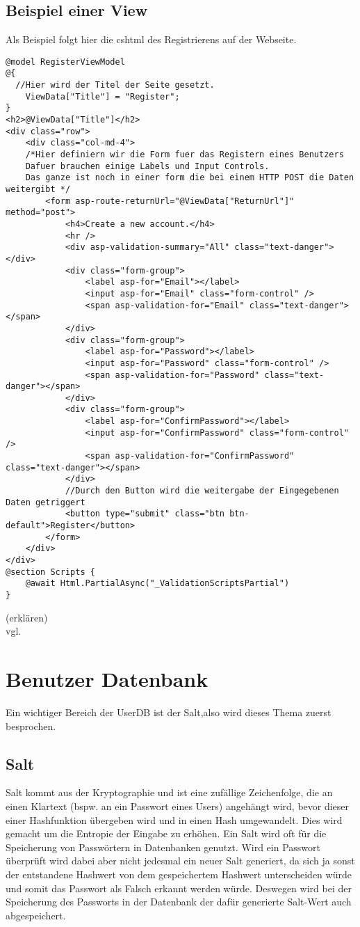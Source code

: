 {\subsection{Beispiel einer View}
\label{mvc_view_beispiel}
Als Beispiel folgt hier die cshtml des Registrierens auf der Webseite.
\begin{lstlisting}
@model RegisterViewModel
@{
  //Hier wird der Titel der Seite gesetzt.
    ViewData["Title"] = "Register";
}
<h2>@ViewData["Title"]</h2>
<div class="row">
    <div class="col-md-4">
    /*Hier definiern wir die Form fuer das Registern eines Benutzers
    Dafuer brauchen einige Labels und Input Controls. 
    Das ganze ist noch in einer form die bei einem HTTP POST die Daten weitergibt */
        <form asp-route-returnUrl="@ViewData["ReturnUrl"]" method="post">
            <h4>Create a new account.</h4>
            <hr />
            <div asp-validation-summary="All" class="text-danger"></div>
            <div class="form-group">
                <label asp-for="Email"></label>
                <input asp-for="Email" class="form-control" />
                <span asp-validation-for="Email" class="text-danger"></span>
            </div>
            <div class="form-group">
                <label asp-for="Password"></label>
                <input asp-for="Password" class="form-control" />
                <span asp-validation-for="Password" class="text-danger"></span>
            </div>
            <div class="form-group">
                <label asp-for="ConfirmPassword"></label>
                <input asp-for="ConfirmPassword" class="form-control" />
                <span asp-validation-for="ConfirmPassword" class="text-danger"></span>
            </div>
            //Durch den Button wird die weitergabe der Eingegebenen Daten getriggert
            <button type="submit" class="btn btn-default">Register</button>
        </form>
    </div>
</div>
@section Scripts {
    @await Html.PartialAsync("_ValidationScriptsPartial")
}
\end{lstlisting}
(erklären)
\\ vgl. \textcite{mic_views}
\section{Benutzer Datenbank}
\label{sec:UserDB}
Ein wichtiger Bereich der UserDB ist der Salt,also wird dieses Thema zuerst besprochen.
\subsection{Salt}
\label{sec:salt}
Salt kommt aus der Kryptographie und ist eine zufällige Zeichenfolge, die an einen Klartext (bspw. an ein Passwort eines Users) angehängt wird, bevor dieser einer Hashfunktion übergeben wird und in einen Hash umgewandelt. Dies wird gemacht um die Entropie der Eingabe zu erhöhen. Ein Salt wird oft für die Speicherung von Passwörtern in Datenbanken genutzt. Wird ein Passwort überprüft wird dabei aber nicht jedesmal ein neuer Salt generiert, da sich ja sonst der entstandene Hashwert von dem gespeichertem Hashwert unterscheiden würde und somit das Passwort als Falsch erkannt werden würde. Deswegen wird bei der Speicherung des Passworts in der Datenbank der dafür generierte Salt-Wert auch abgespeichert.
}
